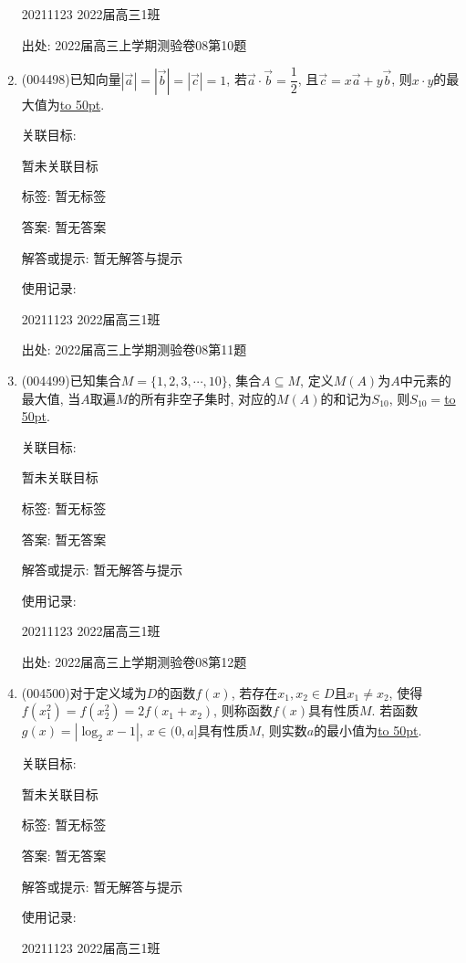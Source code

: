 \documentclass[10pt,a4paper]{article}
\newcommand{\blank}[1]{\underline{\hbox to #1pt{}}}
\begin{document}
\begin{enumerate}[1.]
20211123	2022届高三1班	


出处: 2022届高三上学期测验卷08第10题
\item { (004498)}已知向量$|\overrightarrow a|=|\overrightarrow b|=|\overrightarrow c|=1$, 若$\overrightarrow a\cdot \overrightarrow b=\dfrac 12$, 且$\overrightarrow c=x\overrightarrow a+y\overrightarrow b$, 则$x\cdot y$的最大值为\blank{50}.


关联目标:

暂未关联目标



标签: 暂无标签

答案: 暂无答案

解答或提示: 暂无解答与提示

使用记录:

20211123	2022届高三1班	


出处: 2022届高三上学期测验卷08第11题
\item { (004499)}已知集合$M=\{1,2,3,\cdots,10\}$, 集合$A\subseteq M$, 定义$M(A)$为$A$中元素的最大值, 当$A$取遍$M$的所有非空子集时, 对应的$M(A)$的和记为$S_{10}$, 则$S_{10}=$\blank{50}.


关联目标:

暂未关联目标



标签: 暂无标签

答案: 暂无答案

解答或提示: 暂无解答与提示

使用记录:

20211123	2022届高三1班	


出处: 2022届高三上学期测验卷08第12题
\item { (004500)}对于定义域为$D$的函数$f(x)$, 若存在$x_1,x_2\in D$且$x_1\ne x_2$, 使得$f(x_1^2)=f(x_2^2)=2f(x_1+x_2)$, 则称函数$f(x)$具有性质$M$. 若函数$g(x)=|\log_2x-1|$, $x\in (0,a]$具有性质$M$, 则实数$a$的最小值为\blank{50}.


关联目标:

暂未关联目标



标签: 暂无标签

答案: 暂无答案

解答或提示: 暂无解答与提示

使用记录:

20211123	2022届高三1班	



\end{enumerate}
\end{document}

